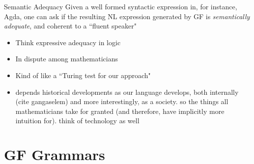\documentclass[10pt]{beamer}
\begin{document}
\begin{frame}

\begin{block}{Semantic Adequacy}
  Given a well formed syntactic expression in, for instance, Agda, one
can ask if the resulting NL expression generated by GF is
\emph{semantically adequate}, and coherent to a ``fluent speaker"

\end{block}

\begin{itemize}
  \item Think expressive adequacy in logic
  \item In dispute among mathematicians
  \item Kind of like a ``Turing test for our approach" %
  \item depends historical developments as our language develops, both
    internally (cite gangaselem) and more interestingly, as a society.
    so the
    things all mathematicians take for granted (and therefore, have implicitly
    more intuition for).  think of technology as well

\end{itemize}
  

\end{frame}

\section{GF Grammars}

\begin{frame}[fragile]
\centering
{}
\end{frame}
\end{document}

